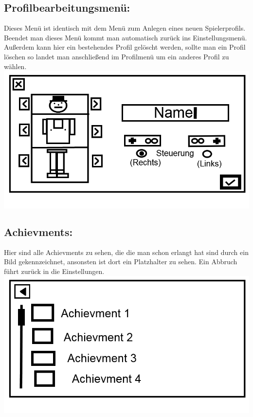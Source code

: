 \documentclass{scrartcl}
\begin{document}
\begin{enumerate}
	\begin{minipage}{1\textwidth}
		\item \subsection*{Profilbearbeitungsmenü:}
		Dieses Menü ist identisch mit dem Menü zum Anlegen eines neuen Spielerprofils.\\
		Beendet man dieses Menü kommt man automatisch zurück ins Einstellungsmenü.\\
		Außerdem kann hier ein bestehendes Profil gelöscht werden, sollte man ein Profil löschen so landet man anschließend im Profilmenü um ein anderes Profil zu wählen.
		\includegraphics[width=\textwidth]{assets/CreateProfile2}
	\end{minipage}

	\begin{minipage}{1\textwidth}
		\item \subsection*{Achievments:}
		Hier sind alle Achievments zu sehen, die die man schon erlangt hat sind durch ein Bild gekennzeichnet, ansonsten ist dort ein Platzhalter zu sehen. Ein Abbruch führt zurück in die Einstellungen.\\
		\includegraphics[width=\textwidth]{assets/Achievments}
	\end{minipage}
	

\end{enumerate}
\end{document}
